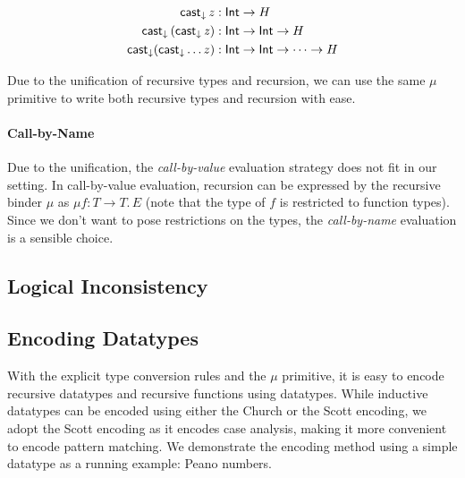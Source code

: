 \begin{align*}
\mathsf{cast}_{\downarrow} \, \mathit{z} &:  \mathsf{Int}  \rightarrow H  \\
\mathsf{cast}_{\downarrow} \, (  \mathsf{cast}_{\downarrow} \, \mathit{z}  ) &:  \mathsf{Int}  \rightarrow  \mathsf{Int}  \rightarrow H \\
 \mathsf{cast}_{\downarrow} ( \mathsf{cast}_{\downarrow}  \dots z) &:  \mathsf{Int}  \rightarrow  \mathsf{Int}  \rightarrow \dots \rightarrow H
\end{align*}

Due to the unification of recursive types and recursion, we can use
the same $\mu$ primitive to write both recursive types and recursion
with ease.

\paragraph{Call-by-Name}
Due to the unification, the \emph{call-by-value} evaluation strategy
does not fit in our setting. In call-by-value evaluation, recursion
can be expressed by the recursive binder $\mu$ as $\mu f : T
\rightarrow T.\, E$ (note that the type of $f$ is restricted to
function types). Since we don't want to pose restrictions on the
types, the \emph{call-by-name} evaluation is a sensible choice.

\subsection{Logical Inconsistency}

  

\subsection{Encoding Datatypes}


With the explicit type conversion rules and the $\mu$ primitive, it is
easy to encode recursive datatypes and recursive functions using
datatypes. While inductive datatypes can be encoded using either the
Church or the Scott encoding, we adopt the Scott encoding as it
encodes case analysis, making it more convenient to
encode pattern matching. We demonstrate the encoding method using a
simple datatype as a running example: Peano numbers.

